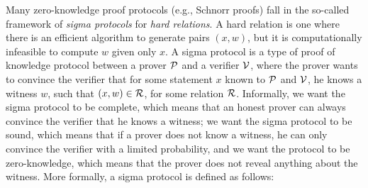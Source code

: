 



Many zero-knowledge proof protocols (e.g., Schnorr proofs) fall in the so-called framework of \emph{sigma protocols} for \emph{hard relations}. 
A hard relation is one where there is an efficient algorithm to generate pairs $(x,w)$, but it is computationally infeasible to compute $w$ given only $x$.
A sigma protocol is a type of proof of knowledge protocol between a prover $\mathcal{P}$ and a verifier $\mathcal{V}$, where the prover wants to convince the verifier that for some statement $x$ known to $\mathcal{P}$ and $\mathcal{V}$, he knows a witness $w$, such that $(x,w) \in \mathcal{R}$, for some relation $\mathcal{R}$. Informally, we want the sigma protocol to be complete, which means that an honest prover can always convince the verifier that he knows a witness; we want the sigma protocol to be sound, which means that if a prover does not know a witness, he can only convince the verifier with a limited probability, and we want the protocol to be zero-knowledge, which means that the prover does not reveal anything about the witness.
More formally, a sigma protocol is defined as follows: 

